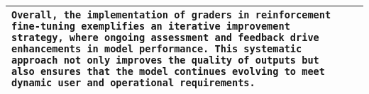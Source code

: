 \begin{table*}[t]
\begin{tabularx}{\textwidth}{X X}
\texttt{Overall, the implementation of graders in reinforcement fine-tuning exemplifies an iterative improvement strategy, where ongoing assessment and feedback drive enhancements in model performance. This systematic approach not only improves the quality of outputs but also ensures that the model continues evolving to meet dynamic user and operational requirements.} 

\\

\bottomrule

\end{tabularx}
\vspace{-0.2in}
\end{table*}